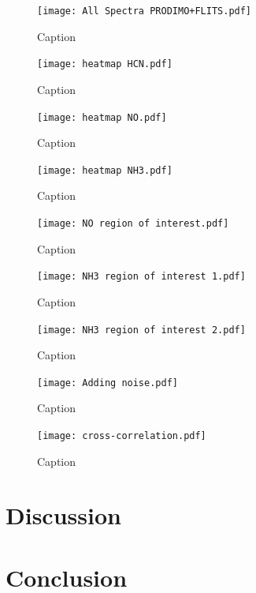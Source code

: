 \documentclass[twoside,single, authoryear, semicolon]{lion-msc}
\begin{document}
\begin{figure}[!ht]
    \centering
    \texttt{[image: All Spectra PRODIMO+FLITS.pdf]}
    \caption{Caption}
    \label{fig:enter-label}
\end{figure}
\begin{figure}[!ht]
    \centering
    \texttt{[image: heatmap HCN.pdf]}
    \caption{Caption}
    \label{fig:enter-label}
\end{figure}
\begin{figure}[!ht]
    \centering
    \texttt{[image: heatmap NO.pdf]}
    \caption{Caption}
    \label{fig:enter-label}
\end{figure}
\begin{figure}[!ht]
    \centering
    \texttt{[image: heatmap NH3.pdf]}
    \caption{Caption}
    \label{fig:enter-label}
\end{figure}
\begin{figure}[!ht]
    \centering
    \texttt{[image: NO region of interest.pdf]}
    \caption{Caption}
    \label{fig:enter-label}
\end{figure}
\begin{figure}[!ht]
    \centering
    \texttt{[image: NH3 region of interest 1.pdf]}
    \caption{Caption}
    \label{fig:enter-label}
\end{figure}
\begin{figure}[!ht]
    \centering
    \texttt{[image: NH3 region of interest 2.pdf]}
    \caption{Caption}
    \label{fig:enter-label}
\end{figure}
\begin{figure}[!ht]
    \centering
    \texttt{[image: Adding noise.pdf]}
    \caption{Caption}
    \label{fig:enter-label}
\end{figure}
\begin{figure}[!ht]
    \centering
    \texttt{[image: cross-correlation.pdf]}
    \caption{Caption}
    \label{fig:enter-label}
\end{figure}

\chapter{Discussion}
\chapter{Conclusion}


\end{document}

